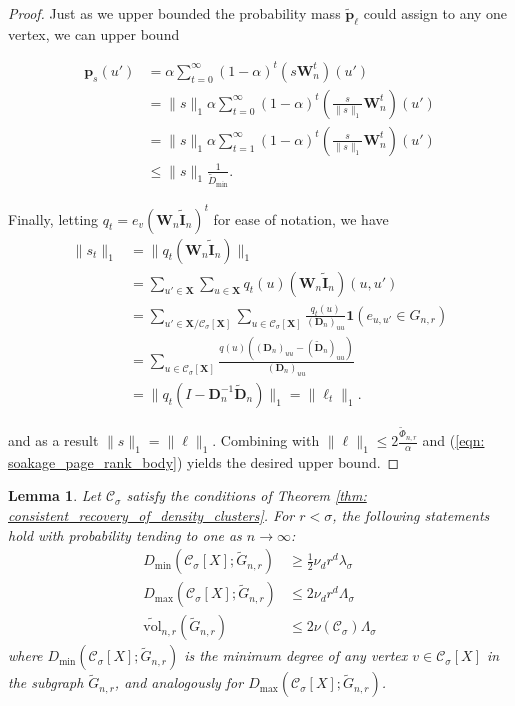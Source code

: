 \documentclass{article}
\newcommand{\vol}{\mathrm{vol}}
\newcommand{\1}{\mathbf{1}}
\newcommand{\pbf}{\mathbf{p}}
\newcommand{\Xbf}{\mathbf{X}}
\newcommand{\Wbf}{\mathbf{W}}
\newcommand{\Dbf}{\mathbf{D}}
\newcommand{\Cset}{\mathcal{C}}
\newcommand{\Csig}{\Cset_{\sigma}}
\theoremstyle{aldenthm}
\newtheorem{lemma}{Lemma}
\begin{document}
\begin{proof}
	Just as we upper bounded the probability mass $\widetilde{\pbf}_{\ell}$ could assign to any one vertex, we can upper bound 
	
	\begin{align} \label{eqn: soakage_page_rank_body}
	\pbf_{s}(u') & = \alpha \sum_{t = 0}^{\infty} (1 - \alpha)^t \left(s \Wbf_n^t \right)(u') \nonumber \\
	& = \|s\|_1 \alpha \sum_{t = 0}^{\infty} (1 - \alpha)^t \left(\frac{s}{\|s\|_1} {\Wbf}_n^t \right)(u')\nonumber \\
	& = \|s\|_1 \alpha \sum_{t = 1}^{\infty} (1 - \alpha)^t \left(\frac{s}{\|s\|_1}  {\Wbf}_n^t \right)(u')\nonumber \\
	& \leq \|s\|_1 \frac{1}{\widetilde{D}_{\min}}.
	\end{align}
	
	Finally, letting $q_t = e_v (\Wbf_n \widetilde{\mathbf{I}}_n)^t$ for ease of notation, we have
	\begin{align*}
	\|s_t\|_1 & = \|q_t (\Wbf_n \widetilde{\mathbf{I}}_n)\|_1 \\
	& = \sum_{u' \in \Xbf} \sum_{u \in \Xbf} q_t(u) (\Wbf_n \widetilde{\mathbf{I}}_n)(u, u')\\
	& = \sum_{u' \in \Xbf / \Csig[\Xbf]} \sum_{u \in \Csig[\Xbf]} \frac{q_t(u)}{(\Dbf_n)_{uu}} \1(e_{u,u'} \in G_{n,r}) \\
	& = \sum_{u \in \Csig[\Xbf]} \frac{q(u) \left((\Dbf_n)_{uu} - (\widetilde{\Dbf}_n)_{uu} \right)}{(\Dbf_n)_{uu}} \\
	& = \|q_t (I - \Dbf_n^{-1} \widetilde{\Dbf}_n)\|_1 = \|\ell_t\|_1.
	\end{align*}
	
	and as a result $\|s\|_1 = \|\ell\|_1$. Combining with $\|\ell\|_1 \leq 2 \frac{\widetilde{\Phi}_{n,r}}{\alpha}$ and (\ref{eqn: soakage_page_rank_body}) yields the desired upper bound.
	
\end{proof}

\begin{lemma}
	\label{lem: ball_bounds_in_probability}
	Let $\Csig$ satisfy the conditions of Theorem \ref{thm: consistent_recovery_of_density_clusters}. For $r < \sigma$, the following statements hold with probability tending to one as $n \to \infty$:
	\begin{align*}
	D_{\min}(\Csig[X]; \widetilde{G}_{n,r}) & \geq \frac{1}{2} \nu_d r^d \lambda_{\sigma} \\
	D_{\max}(\Csig[X]; \widetilde{G}_{n,r}) & \leq 2 \nu_d r^d \Lambda_{\sigma} \\
	\widetilde{\vol}_{n,r}(\widetilde{G}_{n,r}) & \leq 2 \nu(\Csig) \Lambda_{\sigma}
	\end{align*}
	where $D_{\min}(\Csig[X]; \widetilde{G}_{n,r})$ is the minimum degree of any vertex $v \in \Csig[X]$ in the subgraph $\widetilde{G}_{n,r}$, and analogously for $D_{\max}(\Csig[X]; \widetilde{G}_{n,r})$.
\end{lemma}
\end{document}
